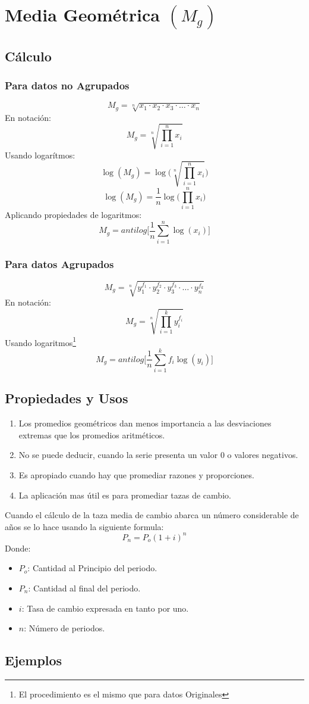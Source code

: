 \section{Media Geométrica $(M_g)$}
\subsection{Cálculo}
\subsubsection{Para datos no Agrupados}
$$M_g=\sqrt[n]{x_1\cdot x_2 \cdot x_3 \cdot \ldots \cdot x_n}$$
En notación:
$$M_g = \sqrt[n]{\prod_{i=1}^{n}x_i}$$
Usando logarítmos:
$$\log(M_g)=\log\Bigg(\sqrt[n]{\prod_{i=1}^{n}x_i}\Bigg)$$
$$\log(M_g)=\dfrac{1}{n}\log\Bigg(\prod_{i=1}^{n}x_i\Bigg)$$
Aplicando propiedades de logaritmos:
$$M_g=antilog\Bigg[\dfrac{1}{n}\sum_{i=1}^{n}\log(x_i)\Bigg]$$
\subsubsection{Para datos Agrupados}
$$M_g=\sqrt[n]{y_1^{f_1}\cdot y_2^{f_2} \cdot y_3^{f_3} \cdot \ldots \cdot y_n^{f_k}}$$
En notación:
$$M_g = \sqrt[n]{\prod_{i=1}^{k}y_i^{f_i}}$$
Usando logaritmos\footnote{El procedimiento es el mismo que para datos Originales}
$$M_g=antilog\Bigg[\dfrac{1}{n}\sum_{i=1}^{k}f_i \log(y_i)\Bigg]$$

\subsection{Propiedades y Usos}
\begin{enumerate}
\item Los promedios geométricos dan menos importancia a las desviaciones extremas que los promedios aritméticos.
\item No se puede deducir, cuando la serie presenta un valor $0$ o valores negativos.
\item Es apropiado cuando hay que promediar razones y proporciones.
\item La aplicación mas útil es para promediar tazas de cambio.
\end{enumerate}
Cuando el cálculo de la taza media de cambio abarca un número considerable de años se lo hace usando la siguiente formula:
$$P_n=P_o(1+i)^n$$
Donde:
\begin{itemize}
\item $P_o$: Cantidad al Principio del periodo.
\item $P_n$: Cantidad al final del periodo.
\item $i$: Tasa de cambio expresada en tanto por uno.
\item $n$: Número de periodos.
\end{itemize}
\subsection{Ejemplos}